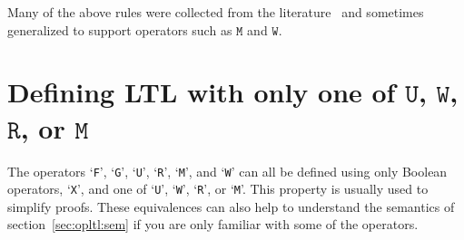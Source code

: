 \documentclass[a4paper,twoside,10pt,DIV=12]{scrreprt}
\newcommand{\U}{\mathbin{\texttt{U}}}
\newcommand{\R}{\mathbin{\texttt{R}}}
\newcommand{\M}{\mathbin{\texttt{M}}}
\newcommand{\W}{\mathbin{\texttt{W}}}
\newcommand{\0}{\texttt{0}}
\newcommand{\1}{\texttt{1}}
\newcommand\samp[1]{`\texttt{#1}'}
\begin{document}
Many of the above rules were collected from the
literature~\cite{somenzi.00.cav,tauriainen.03.a83,babiak.12.tacas} and
sometimes generalized to support operators such as $\M$ and $\W$.

\appendix
\chapter{Defining LTL with only one of $\U$, $\W$, $\R$, or $\M$}
\label{sec:ltl-equiv}

The operators \samp{F}, \samp{G}, \samp{U}, \samp{R}, \samp{M}, and
\samp{W} can all be defined using only Boolean operators, \samp{X},
and one of \samp{U}, \samp{W}, \samp{R}, or \samp{M}.  This property
is usually used to simplify proofs.  These equivalences can also help
to understand the semantics of section~\ref{sec:opltl:sem} if you are
only familiar with some of the operators.
\end{document}

